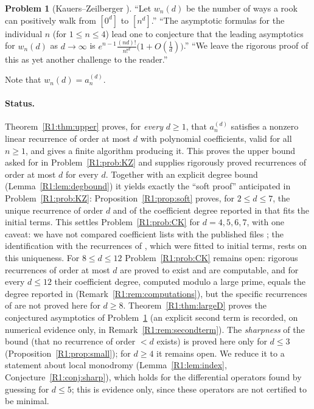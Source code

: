 \documentclass[11pt]{amsart}
\theoremstyle{definition}
\newtheorem{problem}[theorem]{Problem}
\theoremstyle{remark}
\begin{document}
\begin{problem}[{Kauers--Zeilberger \cite[\S8]{R1-KZ}}]\label{R1:prob:KZ8}
``Let $w_n(d)$ be the number of ways a rook can positively walk from $[0^d]$ to $[n^d]$.''
``The asymptotic formulas for the individual $n$ (for $1\le n\le 4$) lead one to conjecture
that the leading asymptotics for $w_n(d)$ as $d\to\infty$ is
$e^{n-1}\frac{(nd)!}{n!^d}\bigl(1+O(\frac1d)\bigr)$.''
``We leave the rigorous proof of this as yet another challenge to the reader.''
\end{problem}

Note that $w_n(d)=a^{(d)}_n$.

\paragraph{Status.}
Theorem~\ref{R1:thm:upper} proves, for \emph{every} $d\ge1$, that $a^{(d)}_n$ satisfies a
nonzero linear recurrence of order at most $d$ with polynomial coefficients, valid for all
$n\ge1$, and gives a finite algorithm producing it. This proves the upper bound asked for in
Problem~\ref{R1:prob:KZ} and supplies rigorously proved recurrences of order at most $d$ for every $d$.
Together with an explicit degree bound (Lemma~\ref{R1:lem:degbound}) it yields exactly the
``soft proof'' anticipated in Problem~\ref{R1:prob:KZ}: Proposition~\ref{R1:prop:soft} proves,
for $2\le d\le7$, the unique recurrence of order $d$ and of the coefficient degree reported in
\cite[\S5]{R1-KZ} that fits the initial terms. This settles Problem~\ref{R1:prob:CK} for
$d=4,5,6,7$, with one caveat: we have not compared coefficient lists with the published
files \cite{R1-KZfiles}; the identification with the recurrences of \cite{R1-KZ}, which were
fitted to initial terms, rests on this uniqueness. For $8\le d\le12$ Problem~\ref{R1:prob:CK}
remains open: rigorous recurrences of order at most $d$ are proved to exist and are
computable, and for every $d\le12$ their coefficient degree, computed modulo a large prime,
equals the degree reported in \cite[\S5]{R1-KZ} (Remark~\ref{R1:rem:computations}), but the
specific recurrences of \cite{R1-KZ} are not proved here for $d\ge8$.
Theorem~\ref{R1:thm:largeD} proves the conjectured asymptotics of Problem~\ref{R1:prob:KZ8}
(an explicit second term is recorded, on numerical evidence only, in
Remark~\ref{R1:rem:secondterm}). The \emph{sharpness} of the bound (that no recurrence of
order $<d$ exists) is proved here only for $d\le3$ (Proposition~\ref{R1:prop:small}); for
$d\ge4$ it remains open. We reduce it to a statement about local monodromy
(Lemma~\ref{R1:lem:index}, Conjecture~\ref{R1:conj:sharp}), which holds for the differential
operators found by guessing for $d\le5$; this is evidence only, since these operators are not
certified to be minimal.
\end{document}
